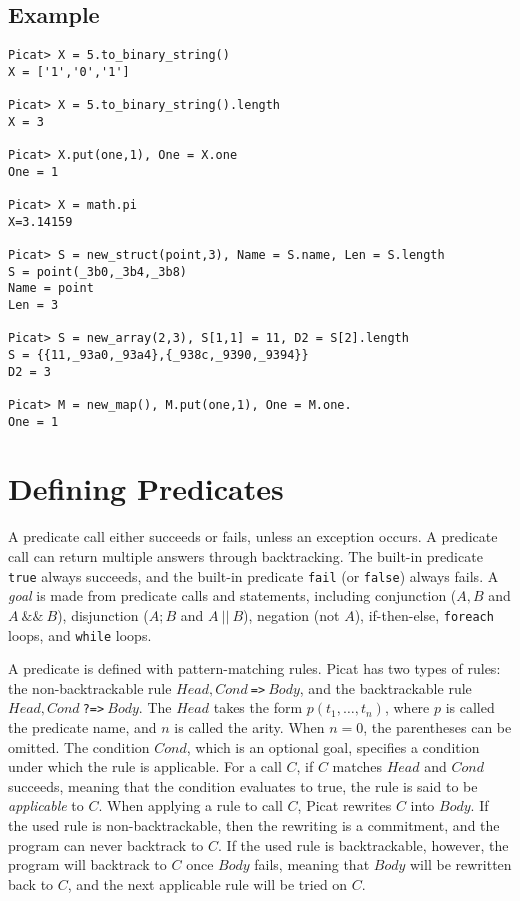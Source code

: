 \subsection*{Example}
\begin{verbatim}
Picat> X = 5.to_binary_string()
X = ['1','0','1']

Picat> X = 5.to_binary_string().length
X = 3

Picat> X.put(one,1), One = X.one
One = 1

Picat> X = math.pi
X=3.14159

Picat> S = new_struct(point,3), Name = S.name, Len = S.length
S = point(_3b0,_3b4,_3b8)
Name = point
Len = 3

Picat> S = new_array(2,3), S[1,1] = 11, D2 = S[2].length
S = {{11,_93a0,_93a4},{_938c,_9390,_9394}}
D2 = 3

Picat> M = new_map(), M.put(one,1), One = M.one.
One = 1
\end{verbatim}

\section{Defining Predicates}
A predicate call either succeeds or fails, unless an exception occurs. A predicate call can return multiple answers through backtracking. The built-in predicate \texttt{true} always succeeds, and the built-in predicate \texttt{fail} (or \texttt{false}) always fails. A \emph{goal} is made from predicate calls and statements, including conjunction ($A,B$ and $A\ \&\&\ B$), disjunction ($A;B$ and $A\ ||\ B$), negation (not $A$), if-then-else, \texttt{foreach} loops, and \texttt{while} loops.

A predicate is defined with pattern-matching rules. Picat has two types of rules: the non-backtrackable rule $Head, Cond\ $\verb+=>+$\ Body$, and the backtrackable rule $Head, Cond\ $\verb+?=>+$\ Body$. The $Head$ takes the form $p(t_1,\ldots,t_n)$, where $p$ is called the predicate name, and $n$ is called the arity. When $n=0$, the parentheses can be omitted. The condition $Cond$, which is an optional goal, specifies a condition under which the rule is applicable. For a call $C$, if $C$ matches $Head$ and $Cond$ succeeds, meaning that the condition evaluates to true, the rule is said to be \emph{applicable} to $C$. When applying a rule to call $C$, Picat rewrites $C$ into $Body$. If the used rule is non-backtrackable, then the rewriting is a commitment, and the program can never backtrack to $C$. If the used rule is backtrackable, however, the program will backtrack to $C$ once $Body$ fails, meaning that $Body$ will be rewritten back to $C$, and the next applicable rule will be tried on $C$. 

